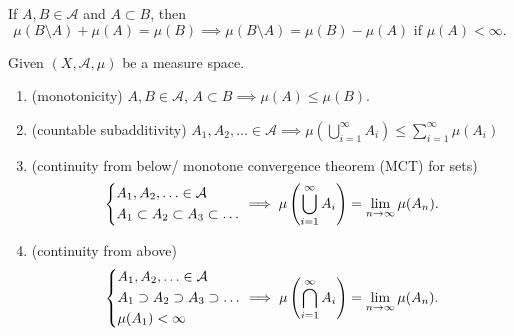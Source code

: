 \begin{note}
	If \(A, B\in \mathcal{A} \) and \(A\subset B\), then
	\[
		\mu(B\setminus A) + \mu(A) = \mu(B) \implies \mu(B \setminus A) = \mu(B) - \mu(A) \text{ if }\mu(A)<\infty.
	\]
\end{note}

\begin{theorem}
	Given \((X, \mathcal{A} , \mu)\) be a measure space.
	\begin{enumerate}
		\item \label{thm:montonicity}(monotonicity) \(A, B\in \mathcal{A} \), \(A\subset B \implies \mu(A)\leq \mu(B)\).
		\item (countable subadditivity) \(A_1, A_2, \ldots \in \mathcal{A} \implies \mu\left(\bigcup\limits_{i=1}^{\infty} A_{i}\right) \leq \sum\limits_{i=1}^{\infty} \mu(A_{i})\)
		\item \label{thm:continuity-from-below}(continuity from below/ monotone convergence theorem (MCT) for sets)
		      \[
			      \begin{dcases}
				      A_1, A_2, \ldots \in \mathcal{A} \\
				      A_1\subset A_2\subset A_3\subset \ldots
			      \end{dcases} \implies \mu\left(\bigcup\limits_{i=1}^{\infty} A_{i}\right) = \lim\limits_{n \to \infty} \mu(A_{n}).
		      \]
		\item \label{thm:continuity-from-above}(continuity from above)
		      \[
			      \begin{dcases}
				      A_1, A_2, \ldots \in \mathcal{A}        \\
				      A_1\supset A_2\supset A_3\supset \ldots \\
				      \mu(A_1) < \infty
			      \end{dcases} \implies \mu\left(\bigcap\limits_{i=1}^{\infty} A_{i}\right) = \lim\limits_{n \to \infty} \mu(A_{n}).
		      \]
	\end{enumerate}
\end{theorem}

